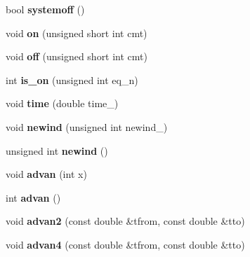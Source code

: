 \begin{DoxyCompactItemize}
\item 
\mbox{\label{classodeproblem_ab23130b9de7b9b8af0f72a01d1168a87}} 
bool {\bfseries systemoff} ()
\item 
\mbox{\label{classodeproblem_a2b6729af8ce989fe14c54657ae7c59f1}} 
void {\bfseries on} (unsigned short int cmt)
\item 
\mbox{\label{classodeproblem_a0f76cc6a34e82e34edc6c68c390bddae}} 
void {\bfseries off} (unsigned short int cmt)
\item 
\mbox{\label{classodeproblem_afa433b145c17640cbcf31e6a72e009f6}} 
int {\bfseries is\+\_\+on} (unsigned int eq\+\_\+n)
\item 
\mbox{\label{classodeproblem_a570f475a1f81d2128fa90b9551ec9c37}} 
void {\bfseries time} (double time\+\_\+)
\item 
\mbox{\label{classodeproblem_a370c76cd4b8ae3ebd2d9ce3b1dd6a013}} 
void {\bfseries newind} (unsigned int newind\+\_\+)
\item 
\mbox{\label{classodeproblem_a352d6631fea50cfe328011c6c337e8d7}} 
unsigned int {\bfseries newind} ()
\item 
\mbox{\label{classodeproblem_a01838d1e6b48e01746eea68d4f1603a2}} 
void {\bfseries advan} (int x)
\item 
\mbox{\label{classodeproblem_a07c37e014e44c8cb933701870ca7f639}} 
int {\bfseries advan} ()
\item 
\mbox{\label{classodeproblem_a197d9523fe129bb7e35e4e20c8e09fc2}} 
void {\bfseries advan2} (const double \&tfrom, const double \&tto)
\item 
\mbox{\label{classodeproblem_a9e2b9f80bd614d5a03109e75e1fde18b}} 
void {\bfseries advan4} (const double \&tfrom, const double \&tto)
\item 
\mbox{\label{classodeproblem_a96c6c7170fe10ea41cd889e5ff0a4dcd}} 

\end{DoxyCompactItemize}
